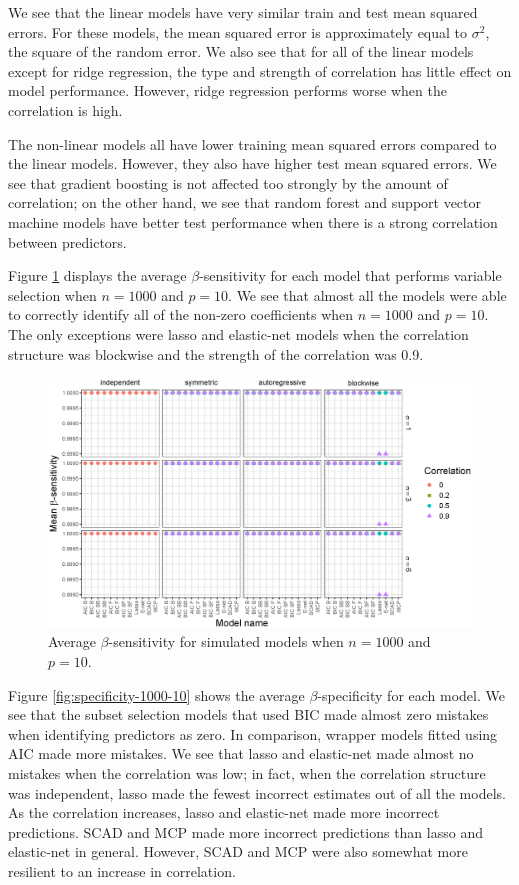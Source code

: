 \documentclass{article}
\begin{document}
We see that the linear models have very similar train and test mean squared errors. For these models, the mean squared error is approximately equal to $\sigma^2$, the square of the random error. We also see that for all of the linear models except for ridge regression, the type and strength of correlation has little effect on model performance. However, ridge regression performs worse when the correlation is high.

The non-linear models all have lower training mean squared errors compared to the linear models. However, they also have higher test mean squared errors. We see that gradient boosting is not affected too strongly by the amount of correlation; on the other hand, we see that random forest and support vector machine models have better test performance when there is a strong correlation between predictors.

Figure \ref{fig:sensitivity-1000-10} displays the average $\beta$-sensitivity for each model that performs variable selection when $n = 1000$ and $p = 10$. We see that almost all the models were able to correctly identify all of the non-zero coefficients when $n = 1000$ and $p = 10$. The only exceptions were lasso and elastic-net models when the correlation structure was blockwise and the strength of the correlation was 0.9.

\begin{figure}[h!]
	\centering
	\includegraphics[width = \textwidth]{images/facet-sensitivity/facet_sensitivity_1000_10.eps}
	\captionsetup{width = 0.8\textwidth}
	\caption{Average $\beta$-sensitivity for simulated models when $n = 1000$ and $p = 10$.}
	\label{fig:sensitivity-1000-10}
\end{figure}

Figure \ref{fig:specificity-1000-10} shows the average $\beta$-specificity for each model. We see that the subset selection models that used BIC made almost zero mistakes when identifying predictors as zero. In comparison, wrapper models fitted using AIC made more mistakes. We see that lasso and elastic-net made almost no mistakes when the correlation was low; in fact, when the correlation structure was independent, lasso made the fewest incorrect estimates out of all the models. As the correlation increases, lasso and elastic-net made more incorrect predictions. SCAD and MCP made more incorrect predictions than lasso and elastic-net in general. However, SCAD and MCP were also somewhat more resilient to an increase in correlation.
\end{document}
